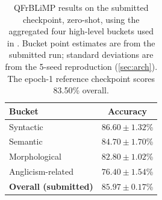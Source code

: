 \documentclass[11pt]{article}
\begin{document}
\begin{table}[t]
\centering
\small
\begin{tabular}{lc}
\toprule
Bucket & Accuracy \\
\midrule
Syntactic & $86.60 \pm 1.32$\% \\
Semantic & $84.70 \pm 1.70$\% \\
Morphological & $82.80 \pm 1.02$\% \\
Anglicism-related & $76.40 \pm 1.54$\% \\
\midrule
\textbf{Overall (submitted)} & $\mathbf{85.97 \pm 0.17}$\% \\
\bottomrule
\end{tabular}%
\caption{QFrBLiMP results on the submitted checkpoint, zero-shot, using the aggregated four high-level buckets used in \citet{beauchemin2025qfrblimp}. Bucket point estimates are from the submitted run; standard deviations are from the 5-seed reproduction (\autoref{sec:arch}). The epoch-1 reference checkpoint scores 83.50\% overall.}
\label{tab:qfrblimp}
\vspace{-1em}
\end{table}
\end{document}
